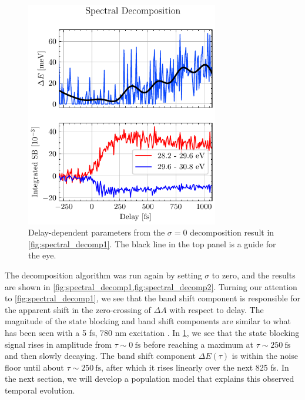 \begin{figure}
	\centering
	\includegraphics[width=0.75\textwidth]{figures/chap4/spectral_decomp2.pdf}
	\caption{Delay-dependent parameters from the $\sigma=0$ decomposition result in \cref{fig:spectral_decomp1}. The black line in the top panel is a guide for the eye.}
	\label{fig:spectral_decomp2}
\end{figure}

The decomposition algorithm was run again by setting $\sigma$ to zero, and the results are shown in \cref{fig:spectral_decomp1,fig:spectral_decomp2}. Turning our attention to \cref{fig:spectral_decomp1}, we see that the band shift component is responsible for the apparent shift in the zero-crossing of $\Delta A$ with respect to delay. The magnitude of the state blocking and band shift components are similar to what has been seen with a 5 fs, 780 nm excitation \cite{zurchDirectSimultaneousObservation2017}. In \cref{fig:spectral_decomp2}, we see that the state blocking signal rises in amplitude from $\tau \sim 0 \ \textrm{fs}$ before reaching a maximum at $\tau \sim 250 \ \textrm{fs}$ and then slowly decaying. The band shift component $\Delta E(\tau)$ is within the noise floor until about $\tau \sim 250 \ \textrm{fs}$, after which it rises linearly over the next 825 fs. In the next section, we will develop a population model that explains this observed temporal evolution.

